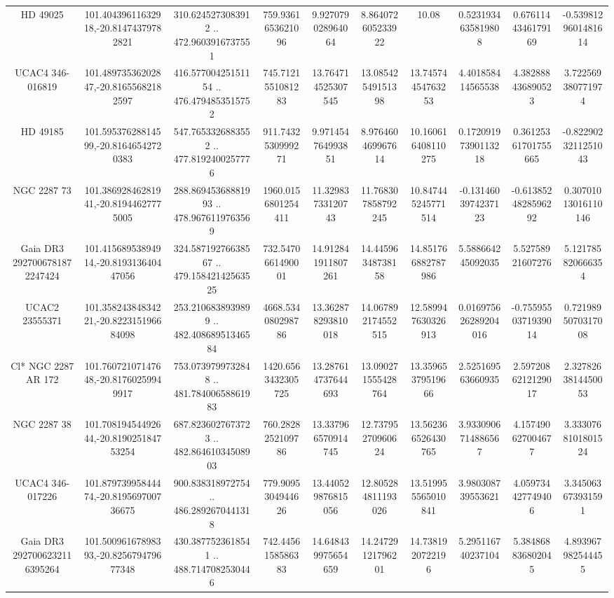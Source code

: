 \begin{table}
\begin{tabular}{cccccccccc}
HD  49025 & 101.40439611632918,-20.81474379782821 & 310.6245273083912 .. 472.9603916737551 & 759.9361653621096 & 9.927079028964064 & 8.864072605233922 & 10.08 & 0.5231934635819808 & 0.6761144346179169 & -0.5398129601481614 \\
UCAC4 346-016819 & 101.48973536202847,-20.81655682182597 & 416.57700425151154 .. 476.4794853515752 & 745.7121551081283 & 13.764714525307545 & 13.08542549151398 & 13.74574454763253 & 4.401858414565538 & 4.382888436890523 & 3.722569380771974 \\
HD  49185 & 101.59537628814599,-20.81646542720383 & 547.7653326883552 .. 477.8192400257776 & 911.7432530999271 & 9.971454764993851 & 8.976460469967614 & 10.160616408110275 & 0.17209197390113218 & 0.36125361701755665 & -0.8229023211251043 \\
NGC  2287    73 & 101.38692846281941,-20.81944627775005 & 288.86945368881993 .. 478.9676119763569 & 1960.0156801254411 & 11.32983733120743 & 11.768307858792245 & 10.847445245771514 & -0.1314603974237123 & -0.6138524828596292 & 0.30701013016110146 \\
Gaia DR3 2927006781872247424 & 101.41568953894914,-20.819313640447056 & 324.58719276638567 .. 479.15842142563525 & 732.5470661490001 & 14.912841911807261 & 14.44596348738158 & 14.851766882787986 & 5.588664245092035 & 5.52758921607276 & 5.121785820666354 \\
UCAC2  23555371 & 101.35824384834221,-20.822315196684098 & 253.2106838939899 .. 482.40868951346584 & 4668.534080298786 & 13.362878293810018 & 14.067892174552515 & 12.589947630326913 & 0.016975626289204016 & -0.7559550371939014 & 0.7219895070317008 \\
Cl* NGC 2287     AR     172 & 101.76072107147648,-20.81760259949917 & 753.0739799732848 .. 481.78400658861983 & 1420.6563432305725 & 13.287614737644693 & 13.090271555428764 & 13.35965379519666 & 2.525169563660935 & 2.5972086212129017 & 2.3278263814450053 \\
NGC  2287    38 & 101.70819454492644,-20.819025184753254 & 687.8236027673723 .. 482.86461034508903 & 760.2828252109786 & 13.337966570914745 & 12.73795270960624 & 13.562366526430765 & 3.9330906714886567 & 4.157490627004677 & 3.3330768101801524 \\
UCAC4 346-017226 & 101.87973995844474,-20.819569700736675 & 900.838318972754 .. 486.2892670441318 & 779.9095304944626 & 13.440529876815056 & 12.805284811193026 & 13.519955565010841 & 3.980308739553621 & 4.059734427749406 & 3.345063673931591 \\
Gaia DR3 2927006232116395264 & 101.50096167898393,-20.825679479677348 & 430.3877523618541 .. 488.7147082530446 & 742.4456158586383 & 14.648439975654659 & 14.24729121796201 & 14.7381920722196 & 5.295116740237104 & 5.384868836802045 & 4.893967982544455 \\

\end{tabular}
\end{table}
